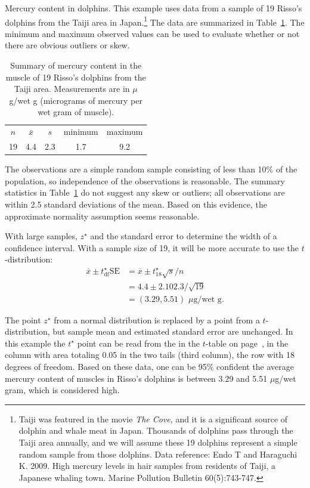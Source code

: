 \begin{example}{Mercury content in dolphins.}
This example uses data from a sample of 19 Risso's dolphins from the Taiji area in Japan.\footnote{Taiji was featured in the movie \emph{The Cove}, and it is a significant source of dolphin and whale meat in Japan. Thousands of dolphins pass through the Taiji area annually, and we will assume these 19 dolphins represent a simple random sample from those dolphins. Data reference: Endo T and Haraguchi K. 2009. High mercury levels in hair samples from residents of Taiji, a Japanese whaling town. Marine Pollution Bulletin 60(5):743-747.} The data are summarized in Table~\ref{summaryStatsOfHgInMuscleOfRissosDolphins}. The minimum and maximum observed values can be used to evaluate whether or not there are obvious outliers or skew.

\begin{table}[h]
\centering
\begin{tabular}{ccc cc}
\hline
$n$ & $\overline{x}$ & $s$ & minimum & maximum \\
19   & 4.4	  & 2.3  & 1.7	       & 9.2 \\
\hline
\end{tabular}
\caption{Summary of mercury content in the muscle of 19 Risso's dolphins from the Taiji area. Measurements are in $\mu$g/wet g (micrograms of mercury per wet gram of muscle).}
\label{summaryStatsOfHgInMuscleOfRissosDolphins}
\end{table}

The observations are a simple random sample consisting of less than 10\% of the population, so independence of the observations is reasonable. The summary statistics in Table~\ref{summaryStatsOfHgInMuscleOfRissosDolphins} do not suggest any skew or outliers; all observations are within 2.5 standard deviations of the mean. Based on this evidence, the approximate normality assumption seems reasonable.

With large samples, $z^{\star}$ and the standard error to determine the width of a confidence interval. With a sample size of 19, it will be more accurate to use the $t$-distribution:
\begin{align*}
\overline{x} \pm  t^{\star}_{\text{df}}\text{SE} &= \overline{x}  \pm  t^{\star}_{18} \sqrt{s}/n \\
&= 4.4 \pm  2.10 2.3/\sqrt{19} \\
&= (3.29, 5.51)\,\, \mu\text{g/wet g}.
\end{align*}

The point $z^{\star}$ from a normal distribution is replaced by a point from a $t$-distribution, but sample mean and estimated standard error are unchanged.  In this example the $t^{\star}$ point can be read from the in the $t$-table on page~\pageref{tTableSample}, in the column with area totaling 0.05 in the two tails (third column), the row with 18 degrees of freedom.  Based on these data, one can be 95\% confident the average mercury content of muscles in Risso's dolphins is between 3.29 and 5.51 $\mu$g/wet gram, which is considered high.
\end{example}

